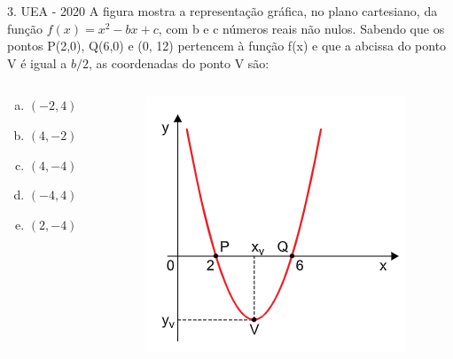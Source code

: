 \documentclass[11pt]{beamer}
\begin{document}
\begin{frame}{3. UEA - 2020}
    A figura mostra a representação gráfica, no plano cartesiano, da função $f(x) = x^{2}- bx+c$, com b e c números reais não nulos. Sabendo que os pontos P(2,0), Q(6,0) e (0, 12) pertencem à função f(x) e que a abcissa do ponto V é igual a ${b}/{2}$, as coordenadas do ponto V são:

    \begin{columns}
        \begin{column}{0.4\textwidth}
            \begin{enumerate}[a)]
                \item $(-2,4)$ 
                \item $(4,-2)$
                \item $(4,-4)$ %
                \item $(-4,4)$
                \item $(2,-4)$
            \end{enumerate}
        \end{column}

        \begin{column}{0.5\textwidth}
            \centering
            \includegraphics[width=0.8\linewidth]{imagens/uea-macro-2020.png}
        \end{column}
    \end{columns}
\end{frame}
\end{document}
